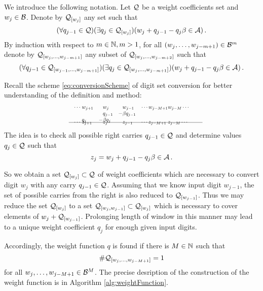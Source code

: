     We introduce the following notation. 
        Let $\mathcal{Q}$ be a weight coefficients set and $w_j\in \mathcal{B}$. Denote by $\mathcal{Q}_{[w_j]}$ any set such that
        $$
            (\forall q_{j-1} \in \mathcal{Q})(\exists q_j \in \mathcal{Q}_{[w_j]})(w_j + q_{j-1} - q_j \beta \in \mathcal{A})\,.
        $$
        By induction with respect to $m \in \mathbb{N}, m>1$, for all $(w_{j},\dots, w_{j-m+1})\in \mathcal{B}^{m}$ denote by $\mathcal{Q}_{[w_{j},\dots, w_{j-m+1}]}$ any subset of  $\mathcal{Q}_{[w_{j},\dots, w_{j-m+2}]}$ such that 
        $$
           (\forall q_{j-1} \in \mathcal{Q}_{[w_{j-1},\dots, w_{j-m+1}]})(\exists q_j \in \mathcal{Q}_{[w_{j},\dots, w_{j-m+1}]})(w_j + q_{j-1} - q_j \beta \in \mathcal{A})\,.
        $$
        
    
  
    Recall the scheme \ref{eq:conversionScheme} of digit set conversion for better understanding of the definition and method:
    \begin{align*}
        \hspace{130pt}\cdots\; &w_{j+1}&\!\! &w_j  & \!\!  &w_{j-1}&\cdots w_{j-M+1} &w_{j-M}\cdots \hspace{130pt} \\[-3pt] 
                         & &       &q_{j-1}& -&\beta q_{j-1} \\[-3pt]
                           &q_j&   -&\beta q_j &&\\[-15pt]      
    \intertext{\hspace{120pt}\line(1,0){250}} 
          \vspace{-15pt}
          \\[-30pt]
     \cdots\; &z_{j+1}& &z_j& &z_{j-1}& \cdots z_{j-M+1}\; &z_{j-M}\cdots                     
    \end{align*}     
    The idea is to check all possible right carries $q_{j-1}\in\mathcal{Q}$ and determine values $q_j\in\mathcal{Q}$ such that 
    $$
    z_j=w_j + q_{j-1} - q_j \beta \in \mathcal{A} \,.
    $$  
    
    So we obtain a set $\mathcal{Q}_{[w_j]}\subset\mathcal{Q}$ of weight coefficients which are necessary to convert digit $w_j$ with any carry $q_{j-1}\in\mathcal{Q}$. Assuming that we know input digit $w_{j-1}$, the set of possible carries from the right is also reduced to $\mathcal{Q}_{[w_{j-1}]}$. Thus we may reduce the set $\mathcal{Q}_{[w_j]}$ to a set $\mathcal{Q}_{[w_j,w_{j-1}]}\subset \mathcal{Q}_{[w_j]}$ which is necessary to cover elements of $w_j + \mathcal{Q}_{[w_{j-1}]}$. Prolonging length of window in this manner may lead to a unique weight coefficient $q_j$ for enough given input digits.  
    
    Accordingly, the weight function $q$ is found if there is $M\in\mathbb{N}$ such that 
    $$
    \#\mathcal{Q}_{[w_{j},\dots, w_{j-M+1}]}=1
    $$
    for all $w_{j},\dots, w_{j-M+1} \in \mathcal{B}^M$. The precise desription of the construction of the weight function is in  Algorithm \ref{alg:weightFunction}.  
 

